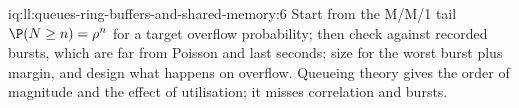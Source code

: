 \begin{solution}{iq:ll:queues-ring-buffers-and-shared-memory:6}
Start from the M/M/1 tail $\P(N \ge n) = \rho^n$ for a target overflow probability; then check against recorded bursts, which are far
from Poisson and last seconds; size for the worst burst plus margin, and design what happens on overflow. Queueing theory gives the
order of magnitude and the effect of utilisation; it misses correlation and bursts.
\end{solution}
